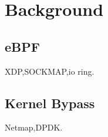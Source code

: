 \section{Background}
\subsection{eBPF}
XDP,SOCKMAP,io ring.
\subsection{Kernel Bypass}
Netmap,DPDK.
